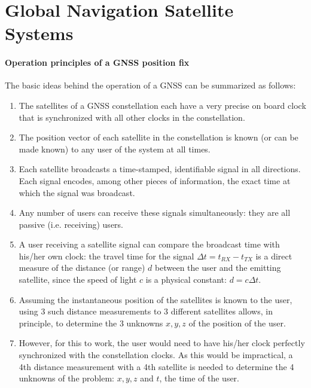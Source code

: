 \section[GNSS]{Global Navigation Satellite Systems}
 
\paragraph{Operation principles of a GNSS position fix}

The basic ideas behind the operation of a GNSS can be summarized as follows:
%
\begin{enumerate}

\item The satellites of a GNSS constellation each have a very precise on
board clock that is synchronized with all other clocks in the constellation.

\item The position vector of each satellite in the constellation is known (or
can be made known) to any user of the system at all times.

\item Each satellite broadcasts a time-stamped, identifiable signal in all
directions. Each signal encodes, among other pieces of information, the exact
time at which the signal was broadcast. 

\item Any number of users can receive these signals simultaneously: they are
all passive (i.e. receiving) users.

\item A user receiving a satellite signal can compare the broadcast time with
his/her own clock: the travel time for the signal $\Delta t = t_{RX} - t_{TX}$
is a direct measure of the distance (or range) $d$ between the user and the
emitting satellite, since the speed of light $c$  is a physical constant: $d =
c\Delta t$.

\item Assuming the instantaneous position of the satellites is known to the 
user, using 3 such distance measurements to 3 different satellites allows, in 
principle, to determine the 3 unknowns $x,y,z$ of the position of the user.

\item However, for this to work, the user would need to have his/her clock
perfectly synchronized with the constellation clocks. As this would be 
impractical, a 4th distance measurement with a 4th satellite is needed to 
determine the 4 unknowns of the problem: $x,y,z$ and $t$, the time of the user.

\end{enumerate}
